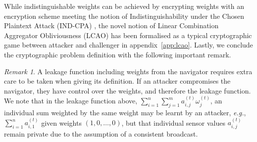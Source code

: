 \documentclass[10pt,letterpaper,oneside,twocolumn,journal]{IEEEtran}
\theoremstyle{definition}
\theoremstyle{definition}
\theoremstyle{remark}
\newtheorem*{remark}{Remark}
\begin{document}
While indistinguishable weights can be achieved by encrypting weights with an encryption scheme meeting the notion of Indistinguishability under the Chosen Plaintext Attack (IND-CPA) \cite{katzIntroductionModernCryptography2008}, the novel notion of Linear Combination Aggregator Obliviousness (LCAO) has been formalised as a typical cryptographic game between attacker and challenger in appendix~\ref{app:lcao}. Lastly, we conclude the cryptographic problem definition with the following important remark.
\begin{remark}
    A leakage function including weights from the navigator requires extra care to be taken when giving its definition. If an attacker compromises the navigator, they have control over the weights, and therefore the leakage function. We note that in the leakage function above, $\sum^n_{i=1}\sum^m_{j=1}a^{(t)}_{i,j}\omega^{(t)}_j$, an individual sum weighted by the same weight may be learnt by an attacker, \textit{e.g.}, $\sum^n_{i=1}a^{(t)}_{i,1}$ given weights $(1,0,\dots,0)$, but that individual sensor values $a^{(t)}_{i,j}$ remain private due to the assumption of a consistent broadcast.
\end{remark}

% 
% 
\end{document}
